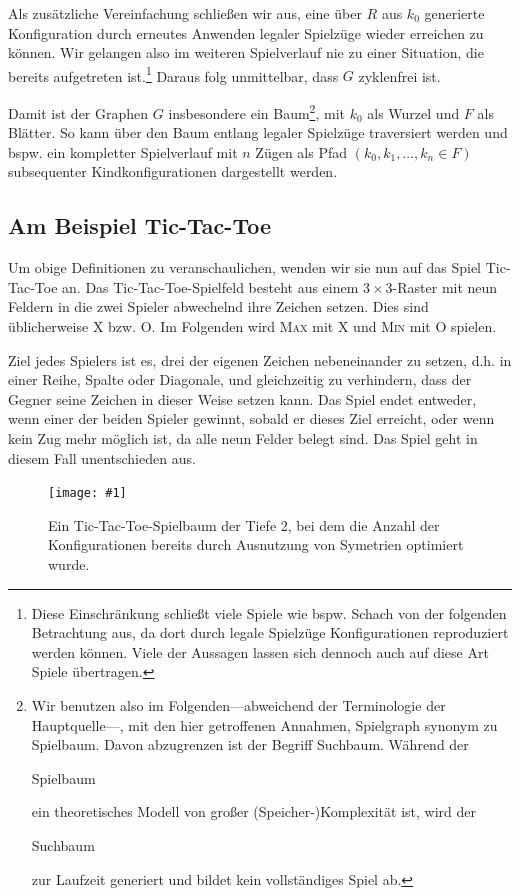 \documentclass[a4paper,twoside]{scrartcl}
\newcommand\e[1]{\begin{em}#1\end{em}}
\newcommand\q[1]{\glqq #1\grqq}
\newcommand\g[4]{%
  \begin{figure}[!ht]
  \label{fig:#2}
  \centering
  \texttt{[image: \#1]}
  \caption{#3}
  \end{figure}}
\begin{document}
Als zusätzliche Vereinfachung schließen wir aus, eine über $R$ aus $k_0$ generierte Konfiguration durch erneutes Anwenden legaler Spielzüge wieder erreichen zu können. Wir gelangen also im weiteren Spielverlauf nie zu einer Situation, die bereits aufgetreten ist.\footnote{Diese Einschränkung schließt viele Spiele wie bspw. Schach von der folgenden Betrachtung aus, da dort durch legale Spielzüge Konfigurationen reproduziert werden können. Viele der Aussagen lassen sich dennoch auch auf diese Art Spiele übertragen.} Daraus folg unmittelbar, dass $G$ zyklenfrei ist.

Damit ist der Graphen $G$ insbesondere ein Baum\footnote{\label{suchbaum}Wir benutzen also im Folgenden---abweichend der Terminologie der Hauptquelle\cite{K:2016}---, mit den hier getroffenen Annahmen, \q{Spielgraph} synonym zu \q{Spielbaum}. Davon abzugrenzen ist der Begriff \q{Suchbaum}. Während der \e{Spielbaum} ein theoretisches Modell von großer (Speicher-)Komplexität ist, wird der \e{Suchbaum} zur Laufzeit generiert und bildet kein vollständiges Spiel ab.}, mit $k_0$ als Wurzel und $F$ als Blätter. So kann über den Baum entlang legaler Spielzüge traversiert werden und bspw. ein kompletter Spielverlauf mit $n$ Zügen als Pfad $(k_0, k_1, \dots, k_n \in F)$ subsequenter Kindkonfigurationen dargestellt werden.


\subsection{Am Beispiel Tic-Tac-Toe}

Um obige Definitionen zu veranschaulichen, wenden wir sie nun auf das Spiel Tic-Tac-Toe an. Das Tic-Tac-Toe-Spielfeld besteht aus einem $3 \times 3$-Raster mit neun Feldern in die zwei Spieler abwechelnd ihre Zeichen setzen. Dies sind üblicherweise \q{X} bzw. \q{O}. Im Folgenden wird \textsc{Max} mit \q{X} und \textsc{Min} mit \q{O} spielen.

Ziel jedes Spielers ist es, drei der eigenen Zeichen nebeneinander zu setzen, d.h. in einer Reihe, Spalte oder Diagonale, und gleichzeitig zu verhindern, dass der Gegner seine Zeichen in dieser Weise setzen kann. Das Spiel endet entweder, wenn einer der beiden Spieler gewinnt, sobald er dieses Ziel erreicht, oder wenn kein Zug mehr möglich ist, da alle neun Felder belegt sind. Das Spiel geht in diesem Fall unentschieden aus.

\g{tic.pdf}{tictactoe}{Ein Tic-Tac-Toe-Spielbaum der Tiefe 2, bei dem die Anzahl der Konfigurationen bereits durch Ausnutzung von Symetrien optimiert wurde.}{.9}
\end{document}
